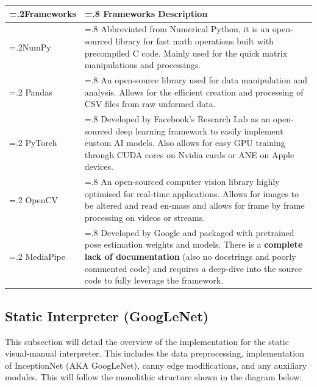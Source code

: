 \documentclass[11pt]{article}
\begin{document}
    \begin{center}
        \begin{tabularx}{1\textwidth}
            { 
            | >{\raggedright\arraybackslash\hsize=.2\hsize}X 
            | >{\raggedright\arraybackslash\hsize=.8\hsize}X | 
            }
            \hline
                \textbf{Frameworks} & \textbf{Frameworks Description} \\ [0.5ex] 
            \hline

            \hline
                \hline
                NumPy & Abbreviated from Numerical Python, it is an open-sourced library for fast math operations built with precompiled C code. Mainly used for the quick matrix manipulations and processings. \\
                \hline
                Pandas & An open-source library used for data manipulation and analysis. Allows for the efficient creation and processing of CSV files from raw unformed data. \\
                \hline
                PyTorch & Developed by Facebook's Research Lab as an open-sourced deep learning framework to easily implement custom AI models. Also allows for easy GPU training through CUDA cores on Nvidia cards or ANE on Apple devices.\\
                \hline
                OpenCV & An open-sourced computer vision library highly optimised for real-time applications. Allows for images to be altered and read en-mass and allows for frame by frame processing on videos or streams.\\
                \hline
                MediaPipe & Developed by Google and packaged with pretrained pose estimation weights and models. There is a \textbf{complete lack of documentation} (also no docstrings and poorly commented code) and requires a deep-dive into the source code to fully leverage the framework.\\
            \hline
        \end{tabularx}
        \end{center}

    \subsection{Static Interpreter (GoogLeNet)}
    This subsection will detail the overview of the implementation for the static visual-manual interpreter. This includes the data preprocessing, implementation of InceptionNet (AKA GoogLeNet), canny edge modifications, and any auxiliary modules. This will follow the monolithic structure shown in the diagram below:
\end{document}
